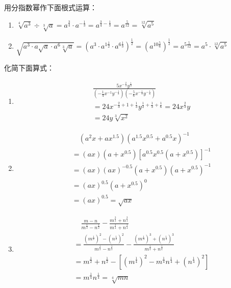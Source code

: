 \begin{example}
    用分指数幂作下面根式运算：
\begin{enumerate}
    \item $\sqrt[4]{a^3}\div \sqrt[3]{a}=a^{\tfrac{3}{4}}\cdot a^{-\tfrac{1}{3}}=a^{\tfrac{3}{4}-\tfrac{1}{3}}=a^{\tfrac{5}{12}}=\sqrt[12]{a^5}$
    \item $\sqrt{a^3\cdot a\sqrt{a}\cdot a^6 \sqrt[3]{a}}=\left(a^3\cdot a^{1\tfrac{1}{2}}\cdot a^{6\tfrac{1}{3}}\right)^{\tfrac{1}{2}}=\left(a^{10\tfrac{5}{6}}\right)^{\tfrac{1}{2}}=a^{5\tfrac{5}{12}}=a^{5}\cdot \sqrt[12]{a^5}$
\end{enumerate}
    
\end{example}

\begin{example}
    化简下面算式：
\begin{enumerate}
    \item \[\begin{split}
&\frac{5 x^{-\tfrac{2}{3}} y^{\tfrac{1}{2}}}{\left(-\frac{1}{4}x^{-1} y^{-\tfrac{1}{3}}\right)\left(-\frac{5}{6} x^{-\tfrac{1}{3}} y^{-\tfrac{1}{6}}\right)} \\
&=24 x^{-\tfrac{2}{3}+1+\tfrac{1}{3}} y^{\tfrac{1}{2}+\tfrac{1}{3}+\tfrac{1}{6}}=24 x^{\tfrac{2}{3}} y \\
&=24 y \sqrt[3]{x^{2}}
\end{split}\]
\item \[\begin{split}
& \quad   \left(a^{2} x+a x^{1.5} \right)\left(a^{1.5} x^{0.5}+a^{0.5} x\right)^{-1}\\
&=(a x)\left(a+x^{0.5}\right)\left[a^{0.5} x^{0.5} \left(a+x^{0.5}\right)\right]^{-1}\\
&=(a x)(a x)^{-0.5}\left(a+x^{0.5}\right)\left(a+x^{0.5}\right)^{-1}\\
&=(a x)^{0.5}\left(a+x^{0.5}\right)^{0}\\
&=(a x)^{0.5}=\sqrt{a x}
\end{split}\]
\item \[\begin{split}
 &\quad   \frac{m-n}{m^{\tfrac{1}{2}}-n^{\tfrac{1}{2}}}-\frac{m^{\tfrac{3}{4}}+n^{\tfrac{3}{4}}}{m^{\tfrac{1}{4}}+n^{\tfrac{1}{4}}} \\
&=\frac{\left(m^{\tfrac{1}{2}}\right)^2-\left(n^{\tfrac{1}{2}}\right)^2}{m^{\tfrac{1}{2}}-n^{\tfrac{1}{2}}}-\frac{\left(m^{\tfrac{1}{4}}\right)^3+\left(n^{\tfrac{1}{4}}\right)^3}{m^{\tfrac{1}{4}}+n^{\tfrac{1}{4}}} \\
&=m^{\tfrac{1}{2}}+n^{\tfrac{1}{2}}-\left[\left(m^{\tfrac{1}{4}}\right)^2- m^{\tfrac{1}{4}}n^{\tfrac{1}{4}}+\left(n^{\tfrac{1}{4}}\right)^2\right]\\
&=m^{\tfrac{1}{4}}n^{\tfrac{1}{4}}=\sqrt[4]{mn}
\end{split}\]
\end{enumerate}
\end{example}

